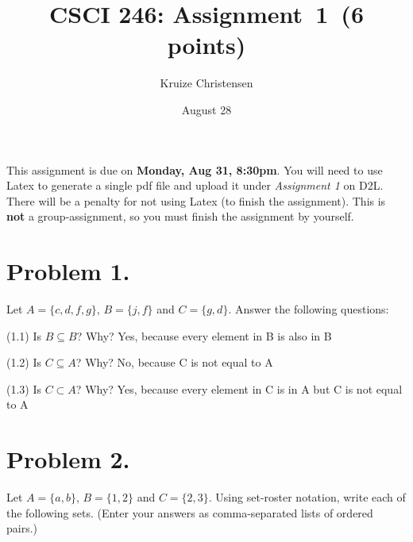 \documentclass[11pt]{article}
\begin{document}
\date{August 28}

\title{CSCI 246: Assignment~1~(6 points)}

\author{Kruize Christensen}

\maketitle


\noindent
This assignment is due on {\bf Monday, Aug 31, 8:30pm}. You will need to
use Latex to generate a single pdf file and upload it under {\em Assignment 1}
on D2L. There will be a penalty for not using Latex (to finish the assignment).
This is {\bf not} a group-assignment, so you must finish the assignment by
yourself.
\newline
 
\section*{Problem 1.}

\noindent
Let $A=\{c,d,f,g\}$, $B=\{j,f\}$ and $C=\{g,d\}$. Answer the following questions:
\newline

\noindent
(1.1) Is $B\subseteq B$? Why?
\newline
\newline
Yes, because every element in B is also in B
\noindent
\newline

\noindent
(1.2) Is $C\subseteq A$? Why?  
\newline 
\newline
No, because C is not equal to A
\noindent
\newline

\noindent
(1.3) Is $C\subset A$? Why?
\newline
\newline
Yes, because every element in C is in A but C is not equal to A
\noindent
\newline

\newpage

\noindent
\section*{Problem 2.}

Let $A=\{a,b\}$, $B=\{1,2\}$ and $C=\{2,3\}$.
Using set-roster notation, write each of the following sets. (Enter your answers as comma-separated lists of ordered pairs.)
\newline
\end{document}
